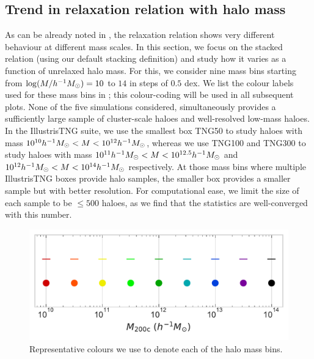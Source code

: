 \subsection{Trend in relaxation relation with halo mass}
\label{sec:results-mass-ch:z0main}
As can be already noted in , the relaxation relation shows very different behaviour at different mass scales. In this section, we focus on the stacked relation (using our default stacking definition) and study how it varies as a function of unrelaxed halo mass. For this, we consider nine mass bins starting from $\log (M/h^{-1}M_{\odot}) = 10$ to $14$ in steps of $0.5$ dex. We list the colour labels used for these mass bins in ; this colour-coding will be used in all subsequent plots. None of the five simulations considered, simultaneously provides a sufficiently large sample of cluster-scale haloes and well-resolved low-mass haloes.
In the IllustrisTNG suite, we use the smallest box TNG50 to study haloes with mass $10^{10} h^{-1}M_{\odot} < M < 10^{12} h^{-1}M_{\odot}$, whereas we use TNG100 and TNG300 to study haloes with mass $10^{11} h^{-1}M_{\odot} < M < 10^{12.5} h^{-1}M_{\odot}$ and $10^{12} h^{-1}M_{\odot} < M < 10^{14} h^{-1}M_{\odot}$ respectively. At those mass bins where multiple IllustrisTNG boxes provide halo samples, the smaller box provides a smaller sample but with better resolution. For computational ease, we limit the size of each sample to be $\leq500$ haloes, as we find that the statistics are well-converged with this number.

\begin{figure}
    \centering
    \includegraphics[width=0.69\linewidth]{plots/Mass_bin_labels.pdf}
    \caption{Representative colours we use to denote each of the halo mass bins.}
    \label{fig:mass_bin_label-ch:z0main}
\end{figure}

